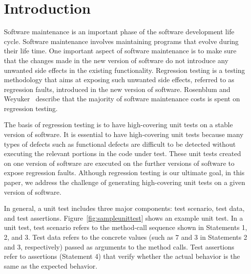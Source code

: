 \section{Introduction}
\label{sec:intro}

Software maintenance is an important phase of the software development 
life cycle. Software maintenance involves maintaining programs that 
evolve during their life time. One important aspect 
of software maintenance is to make sure that the changes made 
in the new version of software do not introduce any unwanted
side effects in the existing functionality. Regression testing is a testing 
methodology that aims at exposing such unwanted side effects, referred to as regression faults, introduced
in the new version of software. Rosenblum and Weyuker~\cite{rosenblum96:regression} describe
that the majority of software maintenance costs is spent on regression testing.

The basis of regression testing is to have high-covering unit tests 
on a stable version of software. It is essential to have high-covering unit tests 
because many types of defects such as functional defects are difficult
to be detected without executing the relevant portions in the code under test.
These unit tests created on one version of software are executed 
on the further versions of software to expose regression faults. 
Although regression testing is our ultimate goal, in this paper, we address
the challenge of generating high-covering unit tests on a given version of software.

In general, a unit test includes three major components: test scenario, test data, and test
assertions. Figure~\ref{fig:sampleunittest} shows an example unit test.
In a unit test, test scenario refers to the method-call sequence shown in Statements
1, 2, and 3. Test data refers to the concrete values (such as 7 and 3
in Statements 2 and 3, respectively) passed as arguments to the method calls. 
Test assertions refer to assertions (Statement 4) that verify whether the actual
behavior is the same as the expected behavior.

